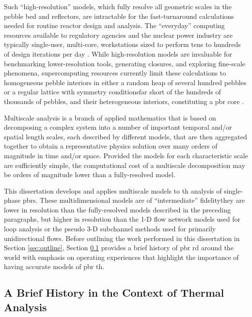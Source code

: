 Such ``high-resolution'' models, which fully resolve all geometric scales in the pebble bed and reflectors, are intractable for the fast-turnaround calculations needed for routine reactor design and analysis. The ``everyday'' computing resources available to regulatory agencies and the nuclear power industry are typically single-user, multi-core, workstations sized to perform tens to hundreds of design iterations per day \cite{nrc_nonlwr}. While high-resolution models are invaluable for benchmarking lower-resolution tools, generating closures, and exploring fine-scale phenomena, supercomputing resources currently limit these calculations to homogeneous pebble interiors in either a random heap of several hundred pebbles or a regular lattice with symmetry conditions\mdash far short of the hundreds of thousands of pebbles, and their heterogeneous interiors, constituting a \gls{pbr} core \cite{calis,zhang2016,baker_2010,alkhalaf,guardo,gunjal}.

Multiscale analysis is a branch of applied mathematics that is based on decomposing a complex system into a number of important temporal and/or spatial length scales, each described by different models, that are then aggregated together to obtain a representative physics solution over many orders of magnitude in time and/or space. Provided the models for each characteristic scale are sufficiently simple, the computational cost of a multiscale decomposition may be orders of magnitude lower than a fully-resolved model. 

This dissertation develops and applies multiscale models to \gls{th} analysis of single-phase \glspl{pbr}. These multidimensional models are of ``intermediate'' fidelity\mdash they are lower in resolution than the fully-resolved models described in the preceding paragraphs, but higher in resolution than the 1-D flow network models used for loop analysis or the pseudo 3-D subchannel methods used for primarily unidirectional flows. Before outlining the work performed in this dissertation in Section \ref{sec:outline}, Section \ref{sec:history} provides a brief history of \gls{pbr} \gls{rd} around the world with emphasis on operating experiences that highlight the importance of having accurate models of \gls{pbr} \gls{th}. 

\subsection{A Brief History in the Context of Thermal Analysis}
\label{sec:history}

